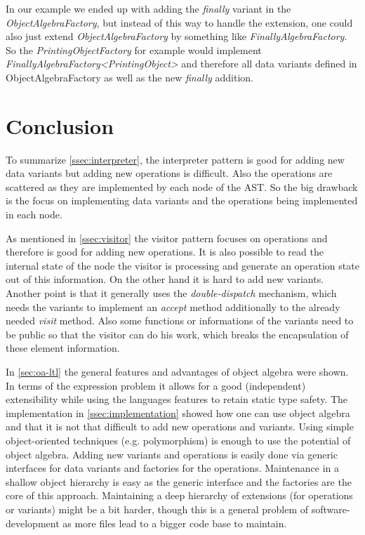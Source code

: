 \documentclass{llncs}
\begin{document}
In our example we ended up with adding the \emph{finally} variant in the \emph{ObjectAlgebraFactory}, but instead of this way to handle the extension, one could also just extend \emph{ObjectAlgebraFactory} by something like \emph{FinallyAlgebraFactory}. So the \emph{PrintingObjectFactory} for example would implement \emph{FinallyAlgebraFactory\textless PrintingObject\textgreater} and therefore all data variants defined in ObjectAlgebraFactory as well as the new \emph{finally} addition.

\section{Conclusion} \label{sec:conclusion}
To summarize \autoref{ssec:interpreter}, the interpreter pattern is good for adding new data variants but adding new operations is difficult. Also the operations are scattered as they are implemented by each node of the AST. So the big drawback is the focus on implementing data variants and the operations being implemented in each node.

As mentioned in \autoref{ssec:visitor} the visitor pattern focuses on operations and therefore is good for adding new operations. It is also possible to read the internal state of the node the visitor is processing and generate an operation state out of this information. On the other hand it is hard to add new variants. Another point is that it generally uses the \emph{double-dispatch} mechanism, which needs the variants to implement an \emph{accept} method additionally to the already needed \emph{visit} method. Also some functions or informations of the variants need to be public so that the visitor can do his work, which breaks the encapsulation of these element information.

In \autoref{sec:oa-ltl} the general features and advantages of object algebra were shown. In terms of the expression problem it allows for a good (independent) extensibility while using the languages features to retain static type safety. The implementation in \autoref{ssec:implementation} showed how one can use object algebra and that it is not that difficult to add new operations and variants. Using simple object-oriented techniques (e.g. polymorphism) is enough to use the potential of object algebra. Adding new variants and operations is easily done via generic interfaces for data variants and factories for the operations. Maintenance in a shallow object hierarchy is easy as the generic interface and the factories are the core of this approach. Maintaining a deep hierarchy of extensions (for operations or variants) might be a bit harder, though this is a general problem of software-development as more files lead to a bigger code base to maintain. 
\end{document}
